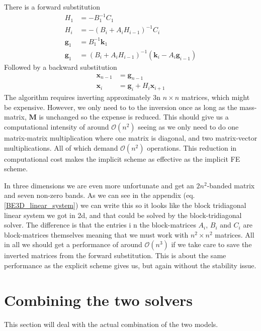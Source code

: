 There is a forward substitution
\begin{align}\label{block_tridiag_alg}
 H_1 &= -B_1^{-1}C_1\nonumber \\
 H_i &= -\left(B_i+A_iH_{i-1}\right)^{-1}C_i \nonumber \\
 \mathbf{g}_1 &= B_1^{-1}\mathbf{k}_1 \nonumber\\
 \mathbf{g}_1 &= \left(B_i+A_iH_{i-1}\right)^{-1}\left(\mathbf{k}_i-A_i\mathbf{g}_{i-1}\right)
 \end{align}
 Followed by a backward substitution
 \begin{align*}
  \mathbf{x}_{n-1} &= \mathbf{g}_{n-1}\nonumber\\
  \mathbf{x}_i &= \mathbf{g}_i + H_i\mathbf{x}_{i+1} \nonumber
 \end{align*}
The algorithm requires inverting approximately 3n $n\times n$ matrices, which might be expensive. 
However, we only need to to the inversion once as long as the mass-matrix, $\mathbf M$ is unchanged so the expense is reduced. 
This should give us a computational intensity of around $\mathcal{O}(n^2)$ seeing as we only need to do one matrix-matrix multiplication where one matrix is diagonal, and two matrix-vector multiplications. 
All of which demand $\mathcal{O}(n^2)$ operations. This reduction in computational cost makes the implicit scheme as effective as the implicit FE scheme.

In three dimensions we are even more unfortunate and get an $2n^2$-banded matrix and seven non-zero bands. 
As we can see in the appendix (eq. \ref{BE3D_linear_system}) we can write this so it looks like the block tridiagonal linear system we got in 2d, and that could be solved by the block-tridiagonal solver. 
The difference is that the entries i n the block-matrices $A_i$, $B_i$ and $C_i$ are block-matrices themselves meaning that we must work with $n^2\times n^2$ matrices. 
All in all we should get a performance of around $\mathcal{O}(n^3)$ if we take care to save the inverted matrices from the forward substitution. 
This is about the same performance as the explicit scheme gives us, but again without the stability issue.

\section{Combining the two solvers}\label{combining_the_solvers}
This section will deal with the actual combination of the two models.\\

